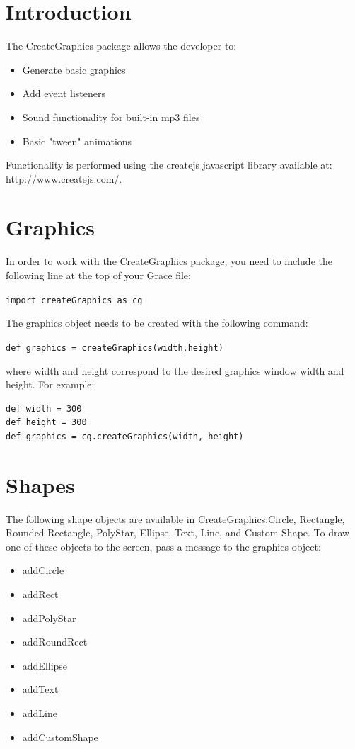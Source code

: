 \documentclass{article}
\begin{document}
\section{Introduction}
The CreateGraphics package allows the developer to:

\begin{itemize}
\item Generate basic graphics
\item Add event listeners
\item Sound functionality for built-in mp3 files
\item Basic "tween" animations
\end{itemize}

Functionality is performed using the createjs javascript library available at:\\
\url{http://www.createjs.com/}. 

\section{Graphics}
In order to work with the CreateGraphics package, you need to include the 
following line at the top of your Grace file:

\texttt{import createGraphics as cg}

The graphics object needs to be created with the following command:

\texttt{def graphics = createGraphics(width,height)} 

where width and height correspond to the desired graphics window width
and height. For example:

\begin{lstlisting}
def width = 300
def height = 300
def graphics = cg.createGraphics(width, height)
\end{lstlisting}

\section{Shapes}
The following shape objects are available in CreateGraphics:Circle, Rectangle, Rounded Rectangle, PolyStar, Ellipse, Text, Line, and Custom Shape.
To draw one of these objects to the screen, pass a message to the graphics object:

\begin{itemize}
\item addCircle
\item addRect
\item addPolyStar
\item addRoundRect
\item addEllipse
\item addText
\item addLine
\item addCustomShape
\end{itemize}
\end{document}
